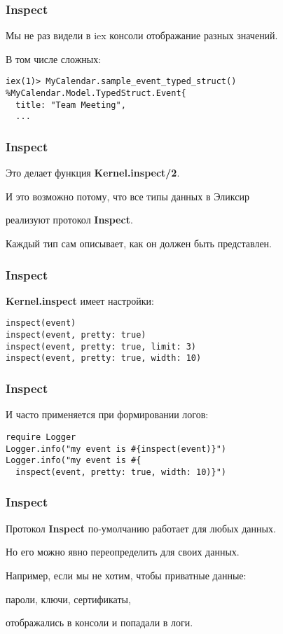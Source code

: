\documentclass[10pt]{beamer}
\begin{document}
\begin{frame}[fragile]
  \frametitle{Inspect}
  Мы не раз видели в iex консоли отображание разных значений.
  \par \bigskip
  В том числе сложных:
  \par \bigskip
  \begin{lstlisting}
iex(1)> MyCalendar.sample_event_typed_struct()
%MyCalendar.Model.TypedStruct.Event{
  title: "Team Meeting",
  ...
  \end{lstlisting}
\end{frame}

\begin{frame}
  \frametitle{Inspect}
  Это делает функция \textbf{Kernel.inspect/2}.
  \par \bigskip
  И это возможно потому, что все типы данных в Эликсир
  \par \bigskip
  реализуют протокол \textbf{Inspect}.
  \par \bigskip
  Каждый тип сам описывает, как он должен быть представлен.
\end{frame}

\begin{frame}[fragile]
  \frametitle{Inspect}
  \textbf{Kernel.inspect} имеет настройки:
  \par \bigskip
  \begin{lstlisting}
inspect(event)
inspect(event, pretty: true)
inspect(event, pretty: true, limit: 3)
inspect(event, pretty: true, width: 10)
  \end{lstlisting}
\end{frame}

\begin{frame}[fragile]
  \frametitle{Inspect}
  И часто применяется при формировании логов:
  \par \bigskip
  \begin{lstlisting}
require Logger
Logger.info("my event is #{inspect(event)}")
Logger.info("my event is #{
  inspect(event, pretty: true, width: 10)}")
  \end{lstlisting}
\end{frame}

\begin{frame}
  \frametitle{Inspect}
  Протокол \textbf{Inspect} по-умолчанию работает для любых данных.
  \par \bigskip
  Но его можно явно переопределить для своих данных.
\end{frame}

\begin{frame}
  Например, если мы не хотим, чтобы приватные данные:
  \par \bigskip
  пароли, ключи, сертификаты,
  \par \bigskip
  отображались в консоли и попадали в логи.
\end{frame}
\end{document}

